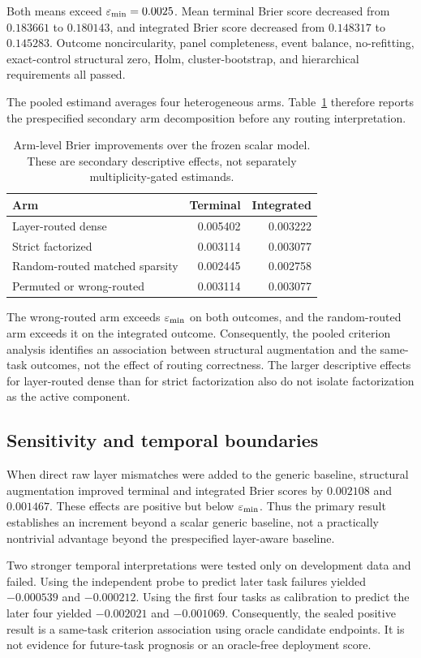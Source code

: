 Both means exceed \(\varepsilon_{\mathrm{min}}=0.0025\).  Mean terminal Brier score decreased from
\(0.183661\) to \(0.180143\), and integrated Brier score decreased from
\(0.148317\) to \(0.145283\).  Outcome noncircularity, panel completeness,
event balance, no-refitting, exact-control structural zero, Holm,
cluster-bootstrap, and hierarchical requirements all passed.

The pooled estimand averages four heterogeneous arms.  Table~\ref{tab:validity-arms}
therefore reports the prespecified secondary arm decomposition before any
routing interpretation.

\begin{table}[ht]
\centering
\caption{Arm-level Brier improvements over the frozen scalar model.  These are
secondary descriptive effects, not separately multiplicity-gated estimands.}
\label{tab:validity-arms}
\begin{tabular}{lrr}
\toprule
Arm & Terminal & Integrated \\
\midrule
Layer-routed dense & 0.005402 & 0.003222 \\
Strict factorized & 0.003114 & 0.003077 \\
Random-routed matched sparsity & 0.002445 & 0.002758 \\
Permuted or wrong-routed & 0.003114 & 0.003077 \\
\bottomrule
\end{tabular}
\end{table}

The wrong-routed arm exceeds \(\varepsilon_{\mathrm{min}}\) on both outcomes, and the random-routed
arm exceeds it on the integrated outcome.  Consequently, the pooled criterion
analysis identifies an association between structural augmentation and the
same-task outcomes, not the effect of routing correctness.  The larger
descriptive effects for layer-routed dense than for strict factorization also
do not isolate factorization as the active component.

\subsection{Sensitivity and temporal boundaries}

When direct raw layer mismatches were added to the generic baseline, structural
augmentation improved terminal and integrated Brier scores by \(0.002108\) and
\(0.001467\).  These effects are positive but below \(\varepsilon_{\mathrm{min}}\).  Thus the
primary result establishes an increment beyond a scalar generic baseline, not
a practically nontrivial advantage beyond the prespecified layer-aware
baseline.

Two stronger temporal interpretations were tested only on development data and
failed.  Using the independent probe to predict later task failures yielded
\(-0.000539\) and \(-0.000212\).  Using the first four tasks as calibration to
predict the later four yielded \(-0.002021\) and \(-0.001069\).  Consequently,
the sealed positive result is a same-task criterion association using oracle
candidate endpoints.  It is not evidence for future-task prognosis or an
oracle-free deployment score.
